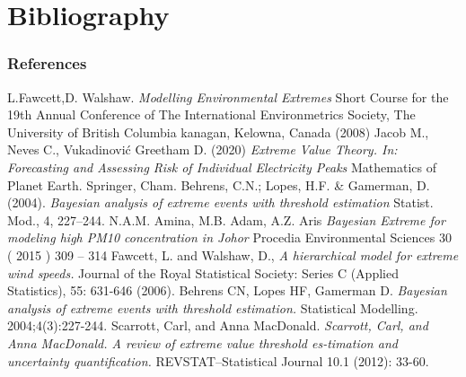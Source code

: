 \documentclass[usenames,dvipsnames]{beamer}
\begin{document}
\section{Bibliography}
\begin{frame}
\frametitle{References}
\begin{thebibliography}{2}
\tiny
{}
L.Fawcett,D. Walshaw.
\emph{Modelling Environmental Extremes}
Short Course for the 19th Annual Conference of The International Environmetrics Society, The University of British Columbia kanagan, Kelowna, Canada (2008)
Jacob M., Neves C., Vukadinović Greetham D. (2020) 
\emph{Extreme Value Theory. In: Forecasting and Assessing Risk of Individual Electricity Peaks}
Mathematics of Planet Earth. Springer, Cham. 
Behrens, C.N.; Lopes, H.F. & Gamerman, D. (2004). 
\emph{Bayesian analysis of extreme
events with threshold estimation}
Statist. Mod., 4, 227–244.
N.A.M. Amina, M.B. Adam, A.Z. Aris
\emph{Bayesian Extreme for modeling high PM10 concentration in Johor }
Procedia Environmental Sciences 30 ( 2015 ) 309 – 314 
Fawcett, L. and Walshaw, D.,
\emph{ A hierarchical model for extreme wind speeds.}
Journal of the Royal Statistical Society: Series C (Applied Statistics), 55: 631-646 (2006). 
Behrens CN, Lopes HF, Gamerman D.
\emph{ Bayesian analysis of extreme events with threshold estimation.}
Statistical Modelling. 2004;4(3):227-244.
Scarrott, Carl, and Anna MacDonald. 
\emph{Scarrott, Carl, and Anna MacDonald. A review of extreme value threshold es-timation and uncertainty quantification.}
REVSTAT–Statistical Journal 10.1 (2012): 33-60.
\end{thebibliography}
\end{frame}
\end{document}
